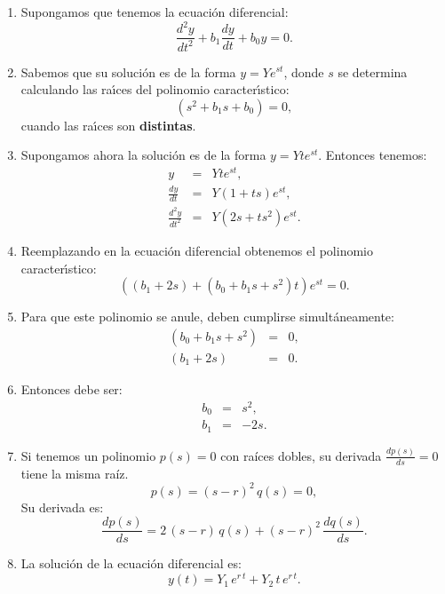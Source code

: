 \documentclass[11pt,a4paper,openany]{book}
\begin{document}
\begin{enumerate}
	\item Supongamos que tenemos la ecuaci\'{o}n diferencial:
	\begin{equation}
		\frac{d^{2}y}{dt^{2}} + b_{1} \frac{dy}{dt} + b_{0} y = 0. 
	\end{equation}
	
	\item Sabemos que su soluci\'{o}n es de la forma $y = Y e^{s t}$, donde $s$ se determina calculando las ra\'{\i}ces del polinomio caracter\'{\i}stico:
	\begin{equation}
		(s^{2} + b_{1} s + b_{0}) = 0,
	\end{equation}
	cuando las ra\'{\i}ces son \textbf{distintas}.
	
	\item Supongamos ahora la soluci\'{o}n es de la forma $y = Y t e^{s t}$. Entonces tenemos:
	\begin{eqnarray}
		y &=& Y t e^{s t},                                      \\
		\frac{dy}{dt} &=& Y (1 + t s) e^{s t},                   \\  
		\frac{d^{2}y}{dt^{2}} &=& Y (2 s + t s^{2}) e^{s t}.
	\end{eqnarray}
	
	\item Reemplazando en la ecuaci\'{o}n diferencial obtenemos el polinomio caracter\'{\i}stico:
	\begin{equation}
		((b_{1} + 2 s) + (b_{0} + b_{1} s + s^{2}) t) e^{s t} = 0.
	\end{equation}
	
	\item Para que este polinomio se anule, deben cumplirse simult\'{a}neamente:
	\begin{eqnarray}
		(b_{0} + b_{1} s + s^{2}) &=& 0, \\
		(b_{1} + 2 s) &=& 0.
	\end{eqnarray}
	
	\item Entonces debe ser:
	\begin{eqnarray}
		b_{0} &=& s^{2}, \\
		b_{1} &=& -2 s.
	\end{eqnarray}
	
	\item Si tenemos un polinomio $p(s) = 0$ con raíces dobles, su derivada $\frac{dp(s)}{ds} = 0$ tiene la misma raíz.
	\begin{equation}
		p(s) = (s - r)^{2} \, q(s) = 0,
	\end{equation}
	Su derivada es:
	\begin{equation}
		\frac{dp(s)}{ds} = 2 \, (s -r) \, q(s) + (s - r)^{2} \, \frac{dq(s)}{ds}.
	\end{equation}
	
	\item La solución de la ecuación diferencial es:
	\begin{equation}
		y(t) = Y_{1} \, e^{r \, t} + Y_{2} \, t \, e^{r \, t}.
	\end{equation}
\end{enumerate}
\end{document}
